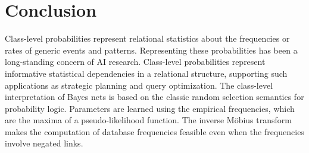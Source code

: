\documentclass[oribibl]{llncs}
\begin{document}
\section{Conclusion} Class-level probabilities represent relational statistics about the frequencies or rates of generic events and patterns. Representing these probabilities has been a long-standing concern of AI research. Class-level probabilities represent informative statistical dependencies in a relational structure, supporting such applications as strategic planning and query optimization. 
The class-level interpretation of Bayes nets is based on the classic random selection semantics for probability logic. 
Parameters are learned using the empirical frequencies, which are the maxima of a pseudo-likelihood function. The inverse M\"obius transform makes the computation of database frequencies feasible even when the frequencies involve negated links. 
\end{document}
